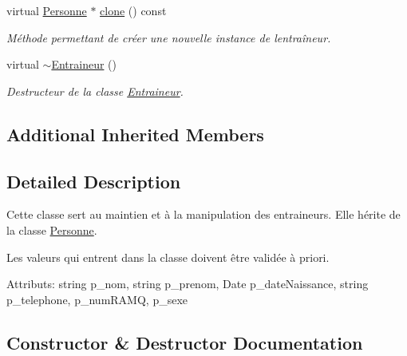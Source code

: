 \begin{DoxyCompactItemize}
virtual \hyperlink{classhockey_1_1Personne}{Personne} $\ast$ \hyperlink{classhockey_1_1Entraineur_a734eb3d04a6209542fbfc989c398613e}{clone} () const
\begin{DoxyCompactList}\small\item\em Méthode permettant de créer une nouvelle instance de l\textquotesingle{}entraîneur. \end{DoxyCompactList}\item 
\mbox{\label{classhockey_1_1Entraineur_a5146ae4be0b4ce34d8056cb0a012d5be}} 
virtual \hyperlink{classhockey_1_1Entraineur_a5146ae4be0b4ce34d8056cb0a012d5be}{$\sim$\+Entraineur} ()
\begin{DoxyCompactList}\small\item\em Destructeur de la classe \hyperlink{classhockey_1_1Entraineur}{Entraineur}. \end{DoxyCompactList}\end{DoxyCompactItemize}
\subsection*{Additional Inherited Members}


\subsection{Detailed Description}
Cette classe sert au maintien et à la manipulation des entraineurs. Elle hérite de la classe \hyperlink{classhockey_1_1Personne}{Personne}. 

Les valeurs qui entrent dans la classe doivent être validée à priori. 

Attributs\+: string p\+\_\+nom, string p\+\_\+prenom, Date p\+\_\+date\+Naissance, string p\+\_\+telephone, p\+\_\+num\+R\+A\+MQ, p\+\_\+sexe 

\subsection{Constructor \& Destructor Documentation}
\mbox{\label{classhockey_1_1Entraineur_a707fdafbb52daf320baf757f7d7c460f}} 
